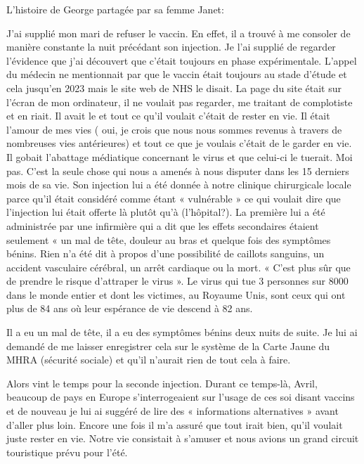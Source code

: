 
L’histoire de George partagée par sa femme Janet:

J’ai supplié mon mari de refuser le vaccin. En effet, il a trouvé à me consoler
de manière constante la nuit précédant son injection. Je l’ai supplié de
regarder l’évidence que j’ai découvert que c’était toujours en phase
expérimentale. L’appel du médecin ne mentionnait par que le vaccin était
toujours au stade d’étude et cela jusqu’en 2023 mais le site web de NHS le
disait. La page du site était sur l’écran de mon ordinateur, il ne voulait pas
regarder, me traitant de complotiste et en riait. Il avait le
 et tout ce qu’il voulait c’était de rester en vie. Il
était l’amour de mes vies ( oui, je crois que nous nous sommes revenus à travers
de nombreuses vies antérieures) et tout ce que je voulais c’était de le garder
en vie. Il gobait l’abattage médiatique concernant le virus et que celui-ci le
tuerait. Moi pas. C’est la seule chose qui nous a amenés à nous disputer dans
les 15 derniers mois de sa vie. Son injection lui a été donnée à notre clinique
chirurgicale locale parce qu’il était considéré comme étant « vulnérable » ce
qui voulait dire que l’injection lui était offerte là plutôt qu’à
(l’hôpital?). La première lui a été administrée par une infirmière qui a dit que
les effets secondaires étaient seulement « un mal de tête, douleur au bras et
quelque fois des symptômes bénins. Rien n’a été dit à propos d’une possibilité
de caillots sanguins, un accident vasculaire cérébral, un arrêt cardiaque ou la
mort. « C’est plus sûr que de prendre le risque d’attraper le virus ». Le virus
qui tue 3 personnes sur 8000 dans le monde entier et dont les victimes, au
Royaume Unis, sont ceux qui ont plus de 84 ans où leur espérance de vie descend
à 82 ans.

Il a eu un mal de tête, il a eu des symptômes bénins deux nuits de suite. Je lui
ai demandé de me laisser enregistrer cela sur le système de la Carte Jaune du
MHRA (sécurité sociale) et qu’il n’aurait rien de tout cela à faire.

Alors vint le temps pour la seconde injection. Durant ce temps-là, Avril,
beaucoup de pays en Europe s’interrogeaient sur l’usage de ces soi disant
vaccins et de nouveau je lui ai suggéré de lire des « informations alternatives
» avant d’aller plus loin. Encore une fois il m’a assuré que tout irait bien,
qu’il voulait juste rester en vie. Notre vie consistait à s’amuser et nous
avions un grand circuit touristique prévu pour l’été.

